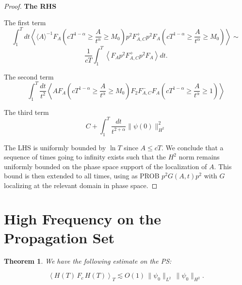 \documentclass[11pt]{article}
\newtheorem{theorem}{Theorem}[section]
\begin{document}
\begin{proof}
{\bf The RHS}

The first term
$$
 \int_{1}^{T} d t\left\langle \langle A\rangle^{-1} F_{A}\left(cT^{1-\alpha}\geq \frac{A}{t^{\alpha}} \geqslant M_{0}\right) p^{2} F_{A,C}^{+} p^{2} F_{A}\left(cT^{1-\alpha}\geq\frac{A}{t^{\alpha}} \geqslant M_{0}\right)\right\rangle\sim
 $$
$$
\frac{1}{cT}\int_1^T \left \langle F_A p^2 F^+_{A,C} p^2 F_A\right \rangle d t.
$$


The second term
$$
\int_{1}^{T} \frac{d t}{t^{2}}\left\langle A F_{A}\left(cT^{1-\alpha}\geq\frac{A}{t^{\alpha}} \geqslant M_{0}\right) F_2 F_{A ,C}^{-} F_{A}\left(cT^{1-\alpha}\geq \frac{A}{t^{\alpha}} \geqslant 1\right)\right\rangle
$$

The third term
$$
C+\int_{1}^{T} \frac{d t}{t^{2+\alpha}}\|\psi(0)\|_{H^{2}}^{2}
$$

The LHS is uniformly bounded by $\ln T$ since $A\leq cT.$
We conclude that a sequence of times going to infinity exists such that the $H^2$ norm remains uniformly bounded on the phase space support of the localization of $A.$ This bound is then extended to all times, using as PROB $p^2G(A,t)p^2$ with $G$ localizing at the relevant domain in phase space. \end{proof}










\section*{High Frequency on the Propagation Set}

\begin{theorem}
We have the following estimate on the PS:

\begin{equation}
\left<H(T)\, F_c\,H(T)\right>_{T}\lesssim O(1)\,\|\psi_0\|_{L^2}\,\|\psi_0\|_{H^2}.
\end{equation}

    
\end{theorem}
\end{document}
